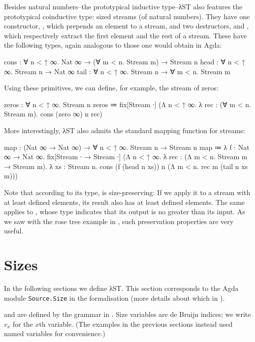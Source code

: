 Besides natural numbers--the prototypical inductive type--λST also features the
prototypical coinductive type: sized streams (of natural numbers). They have one
constructor, , which prepends an element to a stream, and two
destructors,  and , which respectively extract the first
element and the rest of a stream. These have the following types, again
analogous to those one would obtain in Agda:
\begin{code}
  cons : ∀ n < ↑ ∞. Nat ∞ → (∀ m < n. Stream m) → Stream n
  head : ∀ n < ↑ ∞. Stream n → Nat ∞
  tail : ∀ n < ↑ ∞. Stream n → ∀ m < n. Stream m
\end{code}
Using these primitives, we can define, for example, the stream of zeros:
\begin{code}
  zeros : ∀ n < ↑ ∞. Stream n
  zeros ≔ fix[Stream ∙]
            (Λ n < ↑ ∞. λ rec : (∀ m < n. Stream m).
              cons (zero ∞) n rec)
\end{code}
More interestingly, λST also admits the standard mapping function for streams:
\begin{code}
  map : (Nat ∞ → Nat ∞) → ∀ n < ↑ ∞. Stream n → Stream n
  map ≔ λ f : Nat ∞ → Nat ∞. fix[Stream ∙ → Stream ∙]
          (Λ n < ↑ ∞. λ rec : (Λ m < n. Stream m → Stream m). λ xs : Stream n.
            cons (f (head n xs)) n (Λ m < n. rec m (tail n xs m)))
\end{code}
Note that according to its type,  is size-preserving: If we apply it
to a stream with at least  defined elements, its result also has at
least  defined elements. The same applies to , whose type
indicates that its output is no greater than its input. As we saw with the rose
tree example in , such preservation properties are very
useful.


\section{Sizes}
\label{sec:source:sizes}

In the following sections we define λST. This section corresponds to the Agda
module \texttt{Source.\allowbreak Size} in the formalisation (more details about
which in ).

 and  are defined by the grammar in
. Size variables are de Bruijn indices; we write $v_x$ for
the $x$th variable. (The examples in the previous sections instead used named
variables for convenience.)


